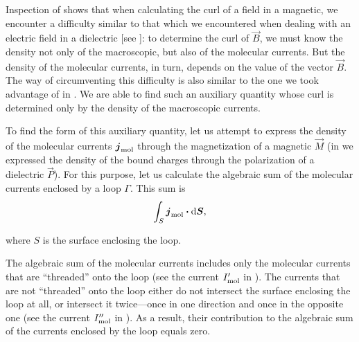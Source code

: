 Inspection of  shows that when calculating the curl of a field in a magnetic, we encounter a difficulty similar to that which we encountered when dealing with an electric field in a dielectric [see ]: to determine the curl of $\vec{B}$, we must know the density not only of the macroscopic, but also of the molecular currents.
But the density of the molecular currents, in turn, depends on the value of the vector $\vec{B}$.
The way of circumventing this difficulty is also similar to the one we took advantage of in .
We are able to find such an auxiliary quantity whose curl is determined only by the density of the macroscopic currents.

To find the form of this auxiliary quantity, let us attempt to express the density of the molecular currents $\boldsymbol{j}_{\text{mol}}$ through the magnetization of a magnetic $\vec{M}$ (in  we expressed the density of the bound charges through the polarization of a dielectric $\vec{P}$).
For this purpose, let us calculate the algebraic sum of the molecular currents enclosed by a loop $\Gamma$.
This sum is
\begin{equation}\label{eq:7_5}
    \int_S \boldsymbol{j}_{\text{mol}} \boldsymbol{\cdot} \mathrm{d}\boldsymbol{S},
\end{equation}

\noindent
where $S$ is the surface enclosing the loop.

The algebraic sum of the molecular currents includes only the molecular currents that are ``threaded'' onto the loop (see the current $I_{\text{mol}}'$ in ).
The currents that are not ``threaded'' onto the loop either do not intersect the surface enclosing the loop at all, or intersect it twice---once in one direction and once in the opposite one (see the current $I_{\text{mol}}''$ in ).
As a result, their contribution to the algebraic sum of the currents enclosed by the loop equals zero.

